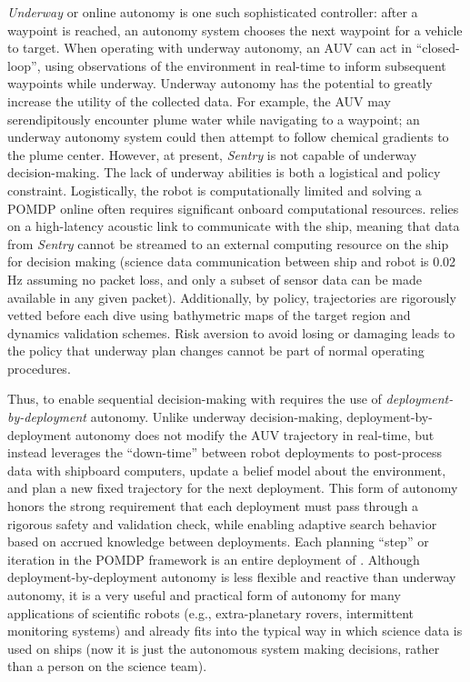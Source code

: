 \textit{Underway} or online autonomy is one such sophisticated controller: after a waypoint is reached, an autonomy system chooses the next waypoint for a vehicle to target. When operating with underway autonomy, an AUV can act in ``closed-loop'', using observations of the environment in real-time to inform subsequent waypoints while underway. Underway autonomy has the potential to greatly increase the utility of the collected data. For example, the AUV may serendipitously encounter plume water while navigating to a waypoint; an underway autonomy system could then attempt to follow chemical gradients to the plume center. However, at present, \emph{Sentry} is not capable of underway decision-making. The lack of underway abilities is both a logistical and policy constraint. Logistically, the robot is computationally limited and solving a POMDP online often requires significant onboard computational resources. \Sentry relies on a high-latency acoustic link to communicate with the ship, meaning that data from \emph{Sentry} cannot be streamed to an external computing resource on the ship for decision making (science data communication between ship and robot is 0.02 Hz assuming no packet loss, and only a subset of sensor data can be made available in any given packet). Additionally, by policy, \Sentry trajectories are rigorously vetted before each dive using bathymetric maps of the target region and dynamics validation schemes. Risk aversion to avoid losing or damaging \Sentry leads to the policy that underway plan changes cannot be part of normal operating procedures.


Thus, to enable sequential decision-making with \Sentry requires the use of \emph{deployment-by-deployment} autonomy. Unlike underway decision-making, deployment-by-deployment autonomy does not modify the AUV trajectory in real-time, but instead leverages the ``down-time'' between robot deployments to post-process data with shipboard computers, update a belief model about the environment, and plan a new fixed trajectory for the next deployment. This form of autonomy honors the strong requirement that each deployment must pass through a rigorous safety and validation check, while enabling adaptive search behavior based on accrued knowledge between deployments. Each planning ``step'' or iteration in the POMDP framework is an entire deployment of \Sentry. Although deployment-by-deployment autonomy is less flexible and reactive than underway autonomy, it is a very useful and practical form of autonomy for many applications of scientific robots (e.g., extra-planetary rovers, intermittent monitoring systems) and already fits into the typical way in which science data is used on ships (now it is just the autonomous system making decisions, rather than a person on the science team). %

